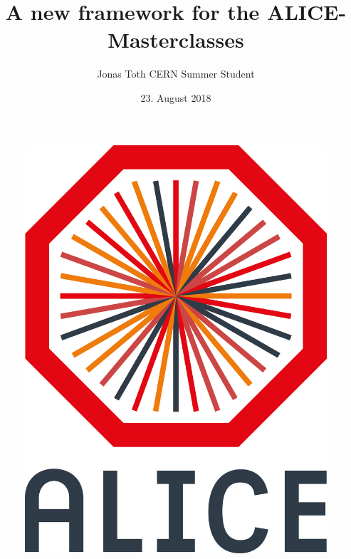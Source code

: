 \documentclass[aspectratio=1610,14pt,dvipsnames]{beamer}
\title[Refactoring ALICE Masterclasses]{A new framework for the ALICE-Masterclasses}
\author[Jonas Toth, CERN Summer Student]{Jonas Toth \linebreak CERN Summer Student}
\date{23. August 2018}
\begin{document}
\begin{frame}
  \titlepage
  \vspace{-0.7cm}
  \begin{figure}
    \centering
    \includegraphics[height=0.3\textheight]{2012-Jul-04-4_Color_Logo_CB.png}\hspace{0cm}
  \end{figure}
\end{frame}
\end{document}
